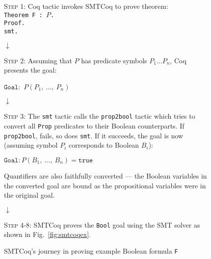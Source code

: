\documentclass[11pt]{article}
\begin{document}
	\begin{figure}[t]
		\begin{framed}
			\textsc{Step 1}: Coq tactic invokes SMTCoq
			to prove theorem:\\
			\texttt{Theorem F : $P$.}\\
			\texttt{Proof.}\\
  			\texttt{smt.}
		\end{framed}
		\vspace{-0.3in}
		\begin{center}
			$\downarrow$
		\end{center}
		\vspace{-0.3in}
		\begin{framed}
			\textsc{Step 2}: Assuming that $P$
			has predicate symbols $P_1 \ldots P_n$, 
			Coq presents the goal:
			\begin{center}
				$\texttt{Goal}:$ $P(P_1,\  
				\ldots,\ P_n)$
			\end{center}
		\end{framed}
		\vspace{-0.3in}
		\begin{center}
			$\downarrow$
		\end{center}
		\vspace{-0.3in}
		\begin{framed}
			\textsc{Step 3}: The \texttt{smt} tactic
			calls the \texttt{prop2bool} tactic 
			which tries to convert all \texttt{Prop}
			predicates to their Boolean counterparts.
			If \texttt{prop2bool}, fails, so does
			\texttt{smt}. If it succeeds, the goal 
			is now (assuming symbol $P_i$ corresponds
			to Boolean $B_i$):
			\begin{center}
				$\texttt{Goal}: P(B_1,\ \ldots,\ B_n)
				= \texttt{true}$
			\end{center}
			Quantifiers are also faithfully converted ---
			the Boolean variables in the converted 
			goal are bound as the propositional 
			variables were in the original goal.
		\end{framed}
		\vspace{-0.3in}
		\begin{center}
			$\downarrow$
		\end{center}
		\vspace{-0.3in}
		\begin{framed}
			\textsc{Step 4-8}: SMTCoq proves the \texttt{Bool}
			goal using the SMT solver as 
			shown in Fig.~\ref{fig:smtcoqex}.
		\end{framed}
		\caption{SMTCoq's journey in proving 
			example Boolean formula \texttt{F}}
		\label{fig:prop2bool}
	\end{figure}
	
\end{document}
